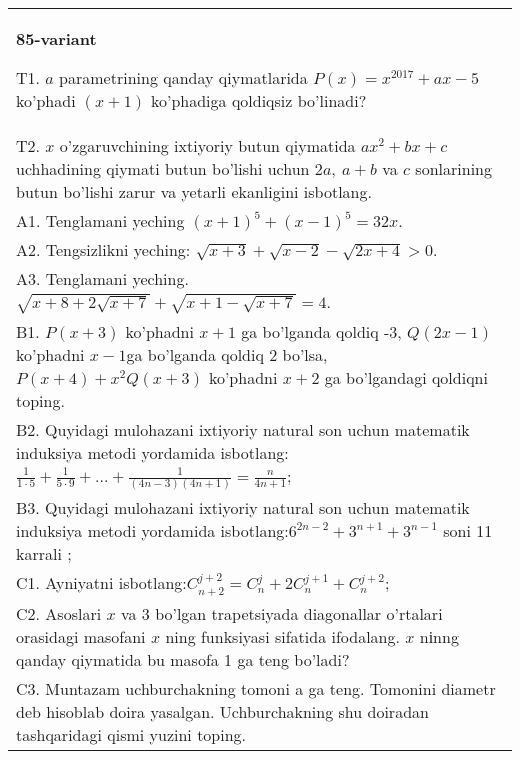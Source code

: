 \documentclass{article}
\begin{document}
\begin{tabular}{m{17cm}}
\textbf{85-variant}
\newline

T1. \(a\) parametrining qanday qiymatlarida \(P(x) = x^{2017} + ax - 5\) ko'phadi \((x + 1)\) ko'phadiga qoldiqsiz bo'linadi? \\
T2. \(x\) o'zgaruvchining ixtiyoriy butun qiymatida \(ax^{2} + bx + c\) uchhadining qiymati butun bo'lishi uchun \(2a,\ a + b\) va \(c\) sonlarining butun bo'lishi zarur va yetarli ekanligini isbotlang. \\
A1. Tenglamani yeching \((x + 1)^{5} + (x - 1)^{5} = 32x\). \\
A2. Tengsizlikni yeching: \(\sqrt{x + 3} + \sqrt{x - 2} - \sqrt{2x + 4} > 0\). \\
A3. Tenglamani yeching. \(\sqrt{x + 8 + 2\sqrt{x + 7}} + \sqrt{x + 1 - \sqrt{x + 7}} = 4\). \\
B1. \(P(x + 3)\) ko'phadni \(x + 1\) ga bo'lganda qoldiq -3, \(Q(2x - 1)\) ko'phadni \(x - 1\)ga bo'lganda qoldiq 2 bo'lsa, \(P(x + 4) + x^{2}Q(x + 3)\) ko'phadni \(x + 2\) ga bo'lgandagi qoldiqni toping. \\
B2. Quyidagi mulohazani ixtiyoriy natural son uchun matematik induksiya metodi yordamida isbotlang: \(\frac{1}{1 \cdot 5} + \frac{1}{5 \cdot 9} + ... + \frac{1}{(4n - 3)(4n + 1)} = \frac{n}{4n + 1}\); \\
B3. Quyidagi mulohazani ixtiyoriy natural son uchun matematik induksiya metodi yordamida isbotlang:\(6^{2n - 2} + 3^{n + 1} + 3^{n - 1}\) soni 11 karrali ; \\
C1. Ayniyatni isbotlang:\(C_{n + 2}^{j + 2} = C_{n}^{j} + 2C_{n}^{j + 1} + C_{n}^{j + 2}\); \\
C2. Asoslari \(x\) va 3 bo'lgan trapetsiyada diagonallar o'rtalari orasidagi masofani \(x\) ning funksiyasi sifatida ifodalang. \(x\) nіnng qanday qiymatida bu masofa 1 ga teng bo'ladi? \\
C3. Muntazam uchburchakning tomoni a ga teng. Tomonini diametr deb hisoblab doira yasalgan. Uchburchakning shu doiradan tashqaridagi qismi yuzini toping. \\

\end{tabular}
\vspace{1cm}
\end{document}
